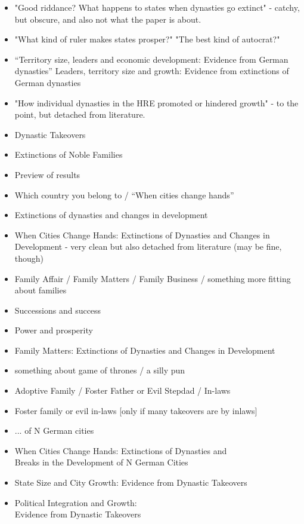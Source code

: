 \documentclass{article}
\begin{document}
\begin{itemize}
    \item "Good riddance? What happens to states when dynasties go extinct" - catchy, but obscure, and also not what the paper is about.
    \item "What kind of ruler makes states prosper?" "The best kind of autocrat?"
    \item ``Territory size, leaders and economic development: Evidence from German dynasties'' {Leaders, territory size and growth: Evidence from extinctions of German dynasties}

    \item "How individual dynasties in the HRE promoted or hindered growth" - to the point, but detached from literature.
    \item Dynastic Takeovers
    \item Extinctions of Noble Families
    \item Preview of results
    \item Which country you belong to / ``When cities change hands''
    \item {Extinctions of dynasties and changes in development}
    \item {When Cities Change Hands: Extinctions of Dynasties and Changes in Development} - very clean but also detached from literature (may be fine, though)
    \item Family Affair / Family Matters / Family Business / something more fitting about families
    \item Successions and success
    \item Power and prosperity
    \item {Family Matters: Extinctions of Dynasties and Changes in Development}
    \item something about game of thrones / a silly pun
    \item Adoptive Family / Foster Father or Evil Stepdad / In-laws
    \item Foster family or evil in-laws [only if many takeovers are by inlaws]
    \item ... of N German cities
    \item {When Cities Change Hands: Extinctions of Dynasties and \\Breaks in the Development of N German Cities}
    \item {State Size and City Growth: Evidence from Dynastic Takeovers}
    \item {Political Integration and Growth: \\Evidence from Dynastic Takeovers}
    \end{itemize}
\end{document}
